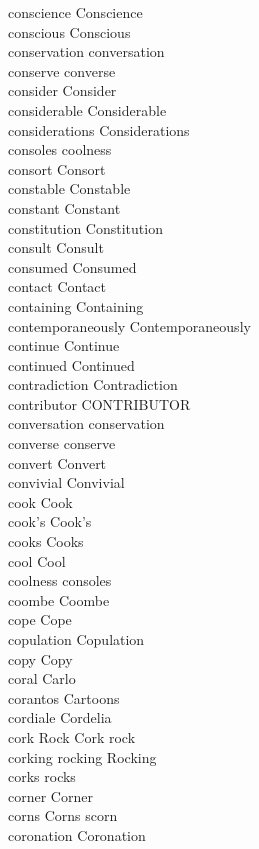 conscience Conscience\\
conscious Conscious\\
conservation conversation\\
conserve converse\\
consider Consider\\
considerable Considerable\\
considerations Considerations\\
consoles coolness\\
consort Consort\\
constable Constable\\
constant Constant\\
constitution Constitution\\
consult Consult\\
consumed Consumed\\
contact Contact\\
containing Containing\\
contemporaneously Contemporaneously\\
continue Continue\\
continued Continued\\
contradiction Contradiction\\
contributor CONTRIBUTOR\\
conversation conservation\\
converse conserve\\
convert Convert\\
convivial Convivial\\
cook Cook\\
cook's Cook's\\
cooks Cooks\\
cool Cool\\
coolness consoles\\
coombe Coombe\\
cope Cope\\
copulation Copulation\\
copy Copy\\
coral Carlo\\
corantos Cartoons\\
cordiale Cordelia\\
cork Rock Cork rock\\
corking rocking Rocking\\
corks rocks\\
corner Corner\\
corns Corns scorn\\
coronation Coronation\\
